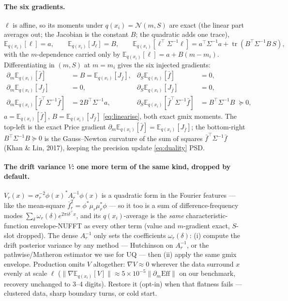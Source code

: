 \documentclass[11pt]{article}
\newcommand{\E}{\mathbb{E}}
\newcommand{\Eqx}{\E_{q(x_i)}}
\newcommand{\tr}{\operatorname{tr}}
\begin{document}
\paragraph{The six gradients.}
$\ell$ is affine, so its moments under $q(x_i)=\mathcal N(m,S)$ are exact
(the linear part averages out; the Jacobian is the constant $B$; the
quadratic adds one trace),
\[
\Eqx[\ell]=a,\qquad
\Eqx[J_\ell]=B,\qquad
\Eqx[\ell^\top\Sigma^{-1}\ell]=a^\top\Sigma^{-1}a+\tr(B^\top\Sigma^{-1}B\,S),
\]
with the $m$-dependence carried only by $\Eqx[\ell]=a+B(m-m_i)$.
Differentiating in $(m,S)$ at $m=m_i$ gives the six injected gradients:
\begin{align*}
\partial_m\Eqx[\bar f] &= B=\Eqx[J_{\bar f}], &
\partial_S\Eqx[\bar f] &= 0,\\
\partial_m\Eqx[J_{\bar f}] &= 0, &
\partial_S\Eqx[J_{\bar f}] &= 0,\\
\partial_m\Eqx[\bar f^\top\Sigma^{-1}\bar f] &= 2B^\top\Sigma^{-1}a, &
\partial_S\Eqx[\bar f^\top\Sigma^{-1}\bar f] &= B^\top\Sigma^{-1}B \;\succeq 0,
\end{align*}
$a=\Eqx[\bar f]$, $B=\Eqx[J_{\bar f}]$ \eqref{eq:linearise}, both exact
gmix moments. The top-left is the exact Price gradient
$\partial_m\Eqx[\bar f]=\Eqx[J_{\bar f}]$; the bottom-right
$B^\top\Sigma^{-1}B\succeq0$ is the Gauss--Newton curvature of the sum of
squares $\bar f^\top\Sigma^{-1}\bar f$ (Khan \& Lin, 2017), keeping the
precision update \eqref{eq:duality} PSD.

\paragraph{The drift variance $V$: one more term of the same kind, dropped by default.}
$V_r(x)=\sigma_r^{-2}\phi(x)^*A_r^{-1}\phi(x)$ is a quadratic form in the
Fourier features --- like the mean-square $\bar f_r^2=\phi^*\mu_r\mu_r^*\phi$
--- so it too is a sum of difference-frequency modes
$\sum_\delta\omega_r(\delta)e^{2\pi i\delta^\top x}$, and its
$q(x_i)$-average is the \emph{same} characteristic-function envelope-NUFFT
as every other term (value and $m$-gradient exact, $S$-slot dropped). The
dense $A_r^{-1}$ only sets the coefficients $\omega_r(\delta)$: (i) compute
the drift posterior variance by any method --- Hutchinson on $A_r^{-1}$, or
the pathwise/Matheron estimator we use for UQ --- then (ii) apply the same
gmix envelope. Production omits $V$ altogether: $\nabla V\approx0$ wherever
the data surround $x$ evenly at scale $\ell$
($\|\nabla\Eqx[V]\|\approx5\times10^{-5}\|\partial_m\mathrm{Eff}\|$ on our
benchmark, recovery unchanged to 3--4 digits). Restore it (opt-in) when
that flatness fails --- clustered data, sharp boundary turns, or cold
start.
\end{document}
